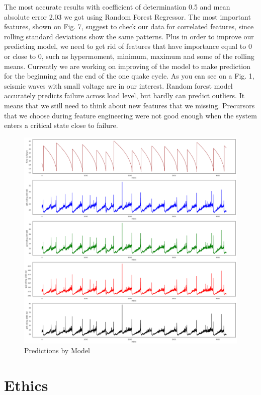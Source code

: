 \documentclass[]{llncs}
\begin{document}
The most accurate results with coefficient of determination 0.5 and mean absolute error 2.03 we got using Random Forest Regressor. The most important features, shown on Fig. 7, suggest to check our data for correlated features, since rolling standard deviations show the same patterns. Plus in order to improve our predicting model, we need to get rid of features that have importance equal to 0 or close to 0, such as hypermoment, minimum, maximum and some of the rolling means. Currently we are working on improving of the model to make prediction for the beginning and the end of the one quake cycle. As you can see on a Fig. 1, seismic waves with small voltage are in our interest. Random forest model accurately predicts failure across load level, but hardly can predict outliers. It means that we still need to think about new features that we missing. Precursors that we choose during feature engineering were not good enough when the system enters a critical state close to failure.
\begin{figure}
	\centering
	\includegraphics[width=1\linewidth]{../GPUProject/Analysis1.png}
	\caption{Predictions by Model}
	\label{fig:morethan90percent}
\end{figure}

\section{Ethics}
\end{document}
